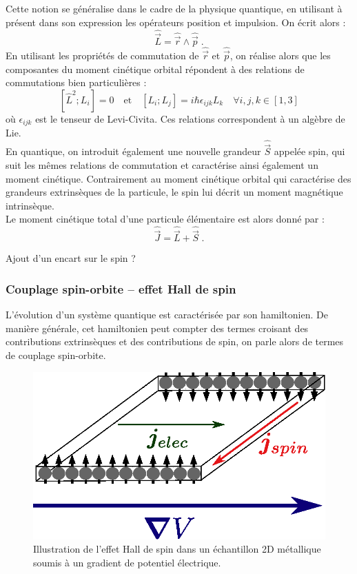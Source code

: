 \documentclass[a4paper,11pt]{article} %
\begin{document}
	Cette notion se généralise dans le cadre de la physique quantique, en utilisant à présent dans son expression les opérateurs position et impulsion. On écrit alors :
	\begin{equation*}
		\hat{\vec{L}} = \hat{\vec{r}} \wedge \hat{\vec{p}} \; .
	\end{equation*}
	En utilisant les propriétés de commutation de $\hat{\vec{r}}$ et $\hat{\vec{p}}$, on réalise alors que les composantes du moment cinétique orbital répondent à des relations de commutations bien particulières :
	\begin{equation*}
		\left[ \hat{L}^2 ; L_i \right] = 0 \quad \text{et} \quad \left[ L_i ; L_j \right] = i \hbar \epsilon_{ijk} L_k \quad \forall i,j,k \in [1,3]
	\end{equation*}
	où $\epsilon_{ijk}$ est le tenseur de Levi-Civita. Ces relations correspondent à un algèbre de Lie.\\
	
	En quantique, on introduit également une nouvelle grandeur $\hat{\vec{S}}$ appelée spin, qui suit les mêmes relations de commutation et caractérise ainsi également un moment cinétique. Contrairement au moment cinétique orbital qui caractérise des grandeurs extrinsèques de la particule, le spin lui décrit un moment magnétique intrinsèque.\\
	
	Le moment cinétique total d'une particule élémentaire est alors donné par :
	\begin{equation*}
		\hat{\vec{J}} = \hat{\vec{L}} + \hat{\vec{S}} \; .
	\end{equation*}
	
	{\color{gray} Ajout d'un encart sur le spin ?}
	
	
	\subsubsection{Couplage spin-orbite -- effet Hall de spin}
	L'évolution d'un système quantique est caractérisée par son hamiltonien. De manière générale, cet hamiltonien peut compter des termes croisant des contributions extrinsèques et des contributions de spin, on parle alors de termes de couplage spin-orbite.
	
	
	\begin{figure}[h]
		\centering
		\begin{minipage}[c]{0.85\linewidth}
			\centering
			\includegraphics[width=0.5\linewidth]{./Illustrations/SHE_electrons.eps}
			\caption{Illustration de l'effet Hall de spin dans un échantillon 2D métallique soumis à un gradient de potentiel électrique.}
			\label{fig:spin-Hall-effect}
		\end{minipage}
	\end{figure}
	
\end{document}
